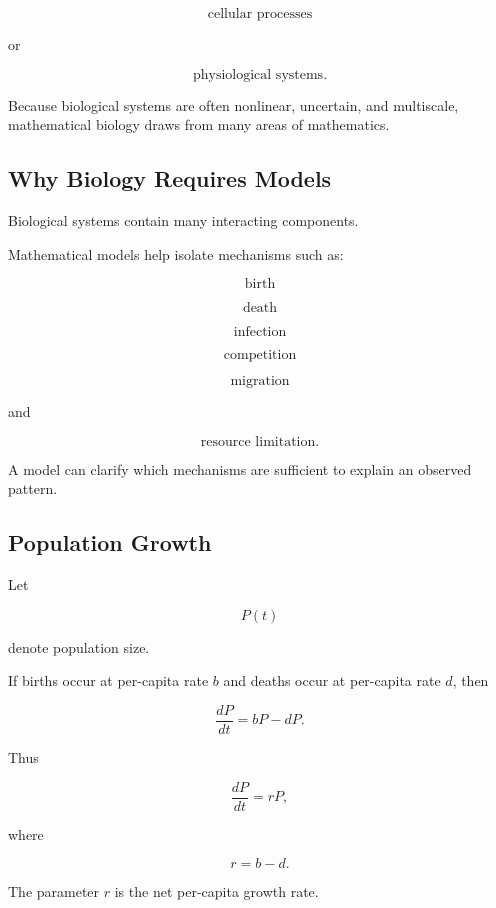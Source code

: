 \[
\boxed{
\text{cellular processes}
}
\]

or

\[
\boxed{
\text{physiological systems}.
}
\]

Because biological systems are often nonlinear, uncertain, and
multiscale, mathematical biology draws from many areas of mathematics.

\subsection{Why Biology Requires Models}
\label{subsec:why-biology-requires-models}

Biological systems contain many interacting components.

Mathematical models help isolate mechanisms such as:

\[
\boxed{
\text{birth}
}
\]

\[
\boxed{
\text{death}
}
\]

\[
\boxed{
\text{infection}
}
\]

\[
\boxed{
\text{competition}
}
\]

\[
\boxed{
\text{migration}
}
\]

and

\[
\boxed{
\text{resource limitation}.
}
\]

A model can clarify which mechanisms are sufficient to explain an observed
pattern.

\subsection{Population Growth}
\label{subsec:population-growth}

Let

\[
P(t)
\]

denote population size.

If births occur at per-capita rate \(b\) and deaths occur at per-capita
rate \(d\), then

\[
\frac{dP}{dt}
=
bP-dP.
\]

Thus

\[
\boxed{
\frac{dP}{dt}
=
rP,
}
\]

where

\[
\boxed{
r=b-d.
}
\]

The parameter \(r\) is the net per-capita growth rate.


